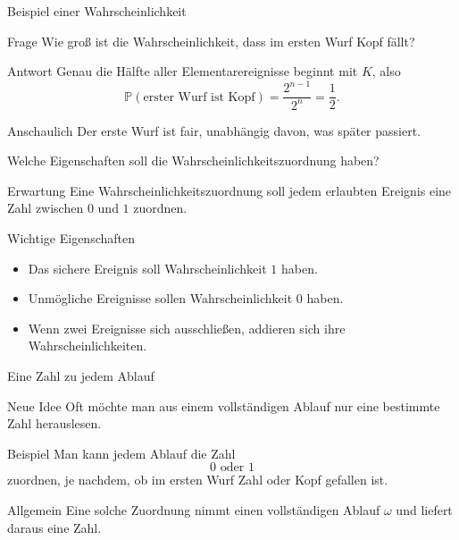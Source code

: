 \documentclass{beamer}
\begin{document}
\begin{frame}{Beispiel einer Wahrscheinlichkeit}
\begin{block}{Frage}
Wie groß ist die Wahrscheinlichkeit, dass im ersten Wurf Kopf fällt?
\end{block}

\begin{block}{Antwort}
Genau die Hälfte aller Elementarereignisse beginnt mit \(K\), also
\[
\mathbb P(\text{erster Wurf ist Kopf})=\frac{2^{n-1}}{2^n}=\frac12.
\]
\end{block}

\begin{block}{Anschaulich}
Der erste Wurf ist fair, unabhängig davon, was später passiert.
\end{block}
\end{frame}

\begin{frame}{Welche Eigenschaften soll die Wahrscheinlichkeitszuordnung haben?}
\begin{block}{Erwartung}
Eine Wahrscheinlichkeitszuordnung soll jedem erlaubten Ereignis eine Zahl zwischen \(0\) und \(1\) zuordnen.
\end{block}

\begin{block}{Wichtige Eigenschaften}
\begin{itemize}
    \item Das sichere Ereignis soll Wahrscheinlichkeit \(1\) haben.
    \item Unmögliche Ereignisse sollen Wahrscheinlichkeit \(0\) haben.
    \item Wenn zwei Ereignisse sich ausschließen, addieren sich ihre Wahrscheinlichkeiten.
\end{itemize}
\end{block}
\end{frame}

\begin{frame}{Eine Zahl zu jedem Ablauf}
\begin{block}{Neue Idee}
Oft möchte man aus einem vollständigen Ablauf nur eine bestimmte Zahl herauslesen.
\end{block}

\begin{block}{Beispiel}
Man kann jedem Ablauf die Zahl
\[
0 \text{ oder } 1
\]
zuordnen, je nachdem, ob im ersten Wurf Zahl oder Kopf gefallen ist.
\end{block}

\begin{block}{Allgemein}
Eine solche Zuordnung nimmt einen vollständigen Ablauf \(\omega\)
und liefert daraus eine Zahl.
\end{block}
\end{frame}
\end{document}
